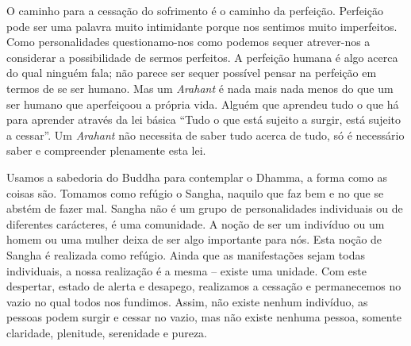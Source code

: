 O caminho para a cessação do sofrimento é o caminho da perfeição. Perfeição pode
ser uma palavra muito intimidante porque nos sentimos muito imperfeitos. Como
personalidades questionamo-nos como podemos sequer atrever-nos a considerar a
possibilidade de sermos perfeitos. A perfeição humana é algo acerca do qual
ninguém fala; não parece ser sequer possível pensar na perfeição em termos de se
ser humano. Mas um \emph{Arahant} é nada mais nada menos do que um ser humano que aperfeiçoou a própria vida. Alguém que aprendeu tudo o que há para aprender através da lei básica “Tudo o que está sujeito a surgir, está sujeito a cessar”. Um
\emph{Arahant} não necessita de saber tudo acerca de tudo, só é necessário saber
e compreender plenamente esta lei.

Usamos a sabedoria do Buddha para contemplar o Dhamma, a forma como as coisas
são. Tomamos como refúgio o Sangha, naquilo que faz bem e no que se abstém de
fazer mal. Sangha não é um grupo de personalidades individuais ou de diferentes
carácteres, é uma comunidade. A noção de ser um indivíduo ou um homem ou uma
mulher deixa de ser algo importante para nós. Esta noção de Sangha é realizada
como refúgio. Ainda que as manifestações sejam todas individuais, a nossa
realização é a mesma -- existe uma unidade. Com este despertar, estado de alerta e
desapego, realizamos a cessação e permanecemos no vazio no qual todos nos
fundimos. Assim, não existe nenhum indivíduo, as pessoas podem surgir e cessar
no vazio, mas não existe nenhuma pessoa, somente claridade, plenitude,
serenidade e pureza.

